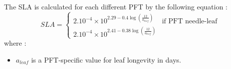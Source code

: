 The SLA is calculated for each different PFT by the following equation :
\begin{equation}
SLA =
\begin{cases}
 2.10^{-4}\times 10^{2.29 - 0.4\log(\frac{12}{a_{leaf}})} & \text{if PFT needle-leaf} \\
 2.10^{-4}\times 10^{2.41 - 0.38\log(\frac{12}{a_{leaf}})}
\end{cases} %
\end{equation}
where : \\
\begin{itemize}
 \item  $a_{leaf}$ is a PFT-specific value for leaf longevity in days.
\end{itemize}

